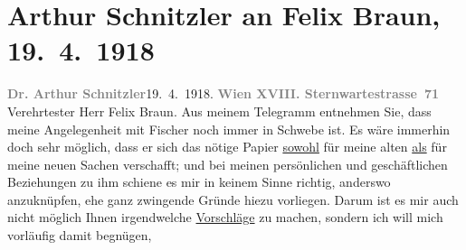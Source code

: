 

         
         \newcommand{\erwaehntePersonen}{Personen: }
         \newcommand{\erwaehnteInstitutionen}{Institutionen: Georg Müller Verlag, S. Fischer Verlag}
         \newcommand{\erwaehnteOrte}{Orte: München, Sternwartestraße, Wien}
         \newcommand{\erwaehnteWerke}{Werke: Casanovas Heimfahrt, Die Schwestern oder Casanova in Spa. Lustspiel in Versen, Doktor Gräsler, Badearzt, Gesammelte Werke}
               \section[Arthur Schnitzler an Felix Braun, 19. 4. 1918]{ Arthur Schnitzler an Felix Braun, 19. 4. 1918}\nopagebreak{}\rehead{ }\begin{ledgroupsized}[t]{13cm}\normalsize\beginnumbering \toendnotes[C]{\smallbreak\pagebreak[2]} 
\toendnotes[C]{\smallbreak}\pstart
           {\pb}\textcolor{gray}{\textbf{Dr. Arthur Schnitzler}}\hfill 19. 4. 1918.\pend
           \pstart
           \textcolor{gray}{\textbf{Wien XVIII. Sternwartestrasse 71}}\pend
           \pstart\center{}Verehrtester Herr Felix Braun.\pend\pstart
           Aus meinem Telegramm entnehmen Sie, dass meine Angelegenheit mit Fischer noch immer in Schwebe ist. Es wäre immerhin doch
                    sehr möglich, dass er sich das nötige Papier \uline{sowohl} für meine alten \uline{als} für meine
                    neuen Sachen verschafft; und bei meinen persönlichen und geschäftlichen
                    Beziehungen zu ihm schiene es mir in keinem Sinne richtig, anderswo anzuknüpfen,
                    ehe ganz zwingende Gründe hiezu vorliegen. Darum ist es mir auch nicht möglich
                    Ihnen \introOben{}irgend\introOben{}welche \uline{Vorschläge} zu machen, sondern ich will mich vorläufig damit begnügen,

\end{ledgroupsized}
